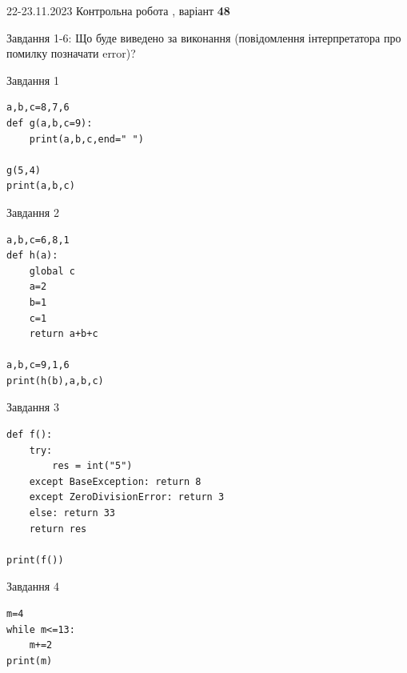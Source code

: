 \documentclass[12pt, ukrainian]{article}
\begin{document}
{{22-23.11.2023 Контрольна робота , варіант  \No \textbf { 48 }\par}}
{

Завдання 1-6: Що буде виведено за виконання (повідомлення інтерпретатора про помилку позначати error)?


\begin{minipage}[t]{9.7cm}                
{\begin{center}Завдання {1}\end{center}}
\begin{verbatim}
a,b,c=8,7,6
def g(a,b,c=9):
    print(a,b,c,end=" ")

g(5,4)
print(a,b,c)
\end{verbatim}     
\end{minipage}
\vline \hspace{8mm}
\begin{minipage}[t]{8.0cm}                
{\begin{center}Завдання {2}\end{center}}
\begin{verbatim}
a,b,c=6,8,1
def h(a):
    global c
    a=2
    b=1
    c=1
    return a+b+c

a,b,c=9,1,6
print(h(b),a,b,c)
\end{verbatim}     
\end{minipage}

\vspace{15mm}
\begin{minipage}[t]{9.7cm}                
{\begin{center}Завдання {3}\end{center}}
\begin{verbatim}
def f():
    try:
        res = int("5")
    except BaseException: return 8
    except ZeroDivisionError: return 3
    else: return 33
    return res

print(f())
\end{verbatim}     
\end{minipage}
\vline \hspace{8mm}
\begin{minipage}[t]{8.0cm}                
{\begin{center}Завдання {4}\end{center}}
\begin{verbatim}
m=4
while m<=13:
    m+=2
print(m)
\end{verbatim}     
\end{minipage}

}
\end{document}
